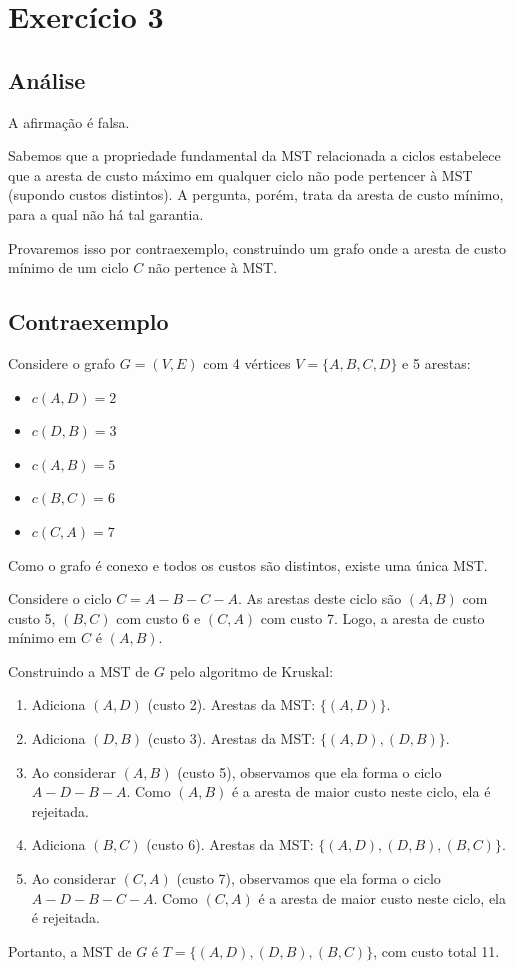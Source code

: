 \documentclass[a4paper,12pt]{article}
\begin{document}
\section*{Exercício 3}

\subsection*{Análise}
A afirmação é falsa.

Sabemos que a propriedade fundamental da MST relacionada a ciclos estabelece que a aresta de custo máximo em qualquer ciclo não pode pertencer à MST (supondo custos distintos). A pergunta, porém, trata da aresta de custo mínimo, para a qual não há tal garantia.

Provaremos isso por contraexemplo, construindo um grafo onde a aresta de custo mínimo de um ciclo $C$ não pertence à MST.

\subsection*{Contraexemplo}
Considere o grafo $G=(V, E)$ com 4 vértices $V = \{A, B, C, D\}$ e 5 arestas:
\begin{itemize}
    \item $c(A, D) = 2$
    \item $c(D, B) = 3$
    \item $c(A, B) = 5$
    \item $c(B, C) = 6$
    \item $c(C, A) = 7$
\end{itemize}
Como o grafo é conexo e todos os custos são distintos, existe uma única MST.

Considere o ciclo $C = A-B-C-A$. As arestas deste ciclo são $(A, B)$ com custo 5, $(B, C)$ com custo 6 e $(C, A)$ com custo 7. Logo, a aresta de custo mínimo em $C$ é $(A, B)$.

Construindo a MST de $G$ pelo algoritmo de Kruskal:
\begin{enumerate}
    \item Adiciona $(A, D)$ (custo 2). Arestas da MST: $\{(A, D)\}$.
    \item Adiciona $(D, B)$ (custo 3). Arestas da MST: $\{(A, D), (D, B)\}$.
    \item Ao considerar $(A, B)$ (custo 5), observamos que ela forma o ciclo $A-D-B-A$. Como $(A, B)$ é a aresta de maior custo neste ciclo, ela é rejeitada.
    \item Adiciona $(B, C)$ (custo 6). Arestas da MST: $\{(A, D), (D, B), (B, C)\}$.
    \item Ao considerar $(C, A)$ (custo 7), observamos que ela forma o ciclo $A-D-B-C-A$. Como $(C, A)$ é a aresta de maior custo neste ciclo, ela é rejeitada.
\end{enumerate}
Portanto, a MST de $G$ é $T = \{(A, D), (D, B), (B, C)\}$, com custo total 11.
\end{document}
